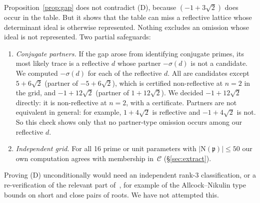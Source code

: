 \documentclass[11pt]{amsart}
\theoremstyle{definition}
\newcommand{\N}{\mathrm{N}}
\begin{document}
Proposition~\ref{prop:gap} does not contradict (D), because $(-1+3\sqrt2)$ does occur in the
table. But it shows that the table can miss a reflective lattice whose determinant ideal is
otherwise represented. Nothing excludes an omission whose ideal is not represented. Two partial
safeguards:
\begin{enumerate}
\item \emph{Conjugate partners.} If the gap arose from identifying conjugate primes, its most
  likely trace is a reflective $d$ whose partner $-\sigma(d)$ is not a candidate. We
  computed $-\sigma(d)$ for each of the \NRefl{} reflective $d$. All are candidates except
  $5+6\sqrt2$ (partner of $-5+6\sqrt2$), which is certified non-reflective at $n=2$ in the
  grid, and $-1+12\sqrt2$ (partner of $1+12\sqrt2$). We decided $-1+12\sqrt2$ directly: it is
  non-reflective at $n=2$, with a certificate. Partners are not equivalent in general: for
  example, $1+4\sqrt2$ is reflective and $-1+4\sqrt2$ is not. So this check shows only that
  no partner-type omission occurs among our reflective $d$.
\item \emph{Independent grid.} For all 16 prime or unit parameters with
  $|\N(\mathfrak p)|\le50$ our own computation agrees with membership in~$\mathcal C$
  (\S\ref{sec:extract}).
\end{enumerate}
Proving (D) unconditionally would need an independent rank-3 classification, or a
re-verification of the relevant part of~\cite{Mar18}, for example of the Allcock--Nikulin
type bounds on short and close pairs of roots. We have not attempted this.
\end{document}

